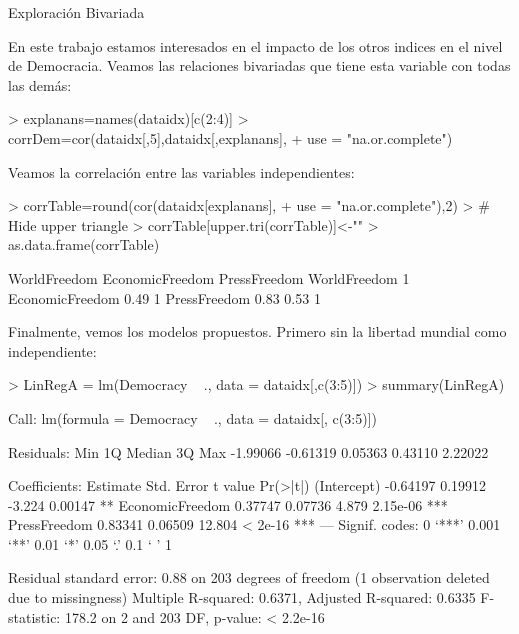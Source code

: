 \documentclass{article}
\begin{document}
Exploración Bivariada

En este trabajo estamos interesados en el impacto de los otros indices en el nivel de Democracia. Veamos las relaciones bivariadas que tiene esta variable con todas las demás:
\begin{Schunk}
\begin{Sinput}
> explanans=names(dataidx)[c(2:4)]
> corrDem=cor(dataidx[,5],dataidx[,explanans],
+     use = "na.or.complete")
\end{Sinput}
\end{Schunk}



Veamos la correlación entre las variables independientes:

\begin{Schunk}
\begin{Sinput}
> corrTable=round(cor(dataidx[explanans],
+                use = "na.or.complete"),2)
> # Hide upper triangle
> corrTable[upper.tri(corrTable)]<-""
> as.data.frame(corrTable)
\end{Sinput}
\begin{Soutput}
                WorldFreedom EconomicFreedom PressFreedom
WorldFreedom               1                             
EconomicFreedom         0.49               1             
PressFreedom            0.83            0.53            1
\end{Soutput}
\end{Schunk}


Finalmente, vemos los modelos propuestos. Primero sin la libertad mundial como independiente:
\begin{Schunk}
\begin{Sinput}
> LinRegA = lm(Democracy ~ ., data = dataidx[,c(3:5)])
> summary(LinRegA)
\end{Sinput}
\begin{Soutput}
Call:
lm(formula = Democracy ~ ., data = dataidx[, c(3:5)])

Residuals:
     Min       1Q   Median       3Q      Max 
-1.99066 -0.61319  0.05363  0.43110  2.22022 

Coefficients:
                Estimate Std. Error t value Pr(>|t|)    
(Intercept)     -0.64197    0.19912  -3.224  0.00147 ** 
EconomicFreedom  0.37747    0.07736   4.879 2.15e-06 ***
PressFreedom     0.83341    0.06509  12.804  < 2e-16 ***
---
Signif. codes:  0 ‘***’ 0.001 ‘**’ 0.01 ‘*’ 0.05 ‘.’ 0.1 ‘ ’ 1

Residual standard error: 0.88 on 203 degrees of freedom
  (1 observation deleted due to missingness)
Multiple R-squared:  0.6371,	Adjusted R-squared:  0.6335 
F-statistic: 178.2 on 2 and 203 DF,  p-value: < 2.2e-16
\end{Soutput}
\end{Schunk}
\end{document}
